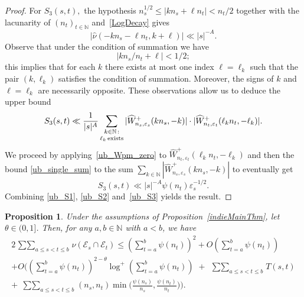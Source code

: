 \documentclass[12pt, reqno]{amsart}
\newtheorem{prop}[thm]{Proposition}
\theoremstyle{definition}
\theoremstyle{remark}
\numberwithin{equation}{section}
\def\tet{{\theta}} \def\bftet{{\boldsymbol \theta}} \def\Tet{{\Theta}}
\def\ls{\leqslant} \def\gs{\geqslant}
\def\leq{\leqslant}
\def \bN {\mathbb N}
\def \cE {\mathcal E}
\begin{document}
\begin{proof}
For $S_3(s,t),$ the hypothesis  $n_s^{1/2}\leq |k n_s+\ell n_t|< n_t/2$ together with the
lacunarity of $(n_t)_{t\in \bN}$
and~\eqref{LogDecay} gives
\[
|\widehat{\nu}\left( -k n_s- \ell n_t, k+\ell \right)| \ll |s|^{-A}.
\]
Observe that under the condition of summation we have
\[
|k n_s/n_t+\ell|< 1/2;
\]
this implies that  for each  $k$ there exists at most one index $\ell=\ell_k$ such that the pair $(k,\ell_k)$ satisfies the condition of summation. Moreover, the signs of $k$ and $\ell=\ell_k$ are necessarily opposite. These observations allow us to deduce the upper bound
\begin{equation*}
S_3(s,t) \ll \frac{1}{|s|^{A}} \mathop{\mathop{\sum}_{ k\in\bN \, : } }_{\ell_k {\rm \, exists}} |\widehat{W}_{n_s,\varepsilon_s}^{+}(k n_s,-k)| 
\cdot
|\widehat{W}_{n_t,\varepsilon_t}^{+}(\ell_k n_t,-\ell_k) |.
\end{equation*}
We proceed by applying~\eqref{ub_Wpm_zero} to $\widehat{W}_{n_t,\varepsilon_t}^{+}(\ell_k n_t,-\ell_k)$
and then the  bound \eqref{ub_single_sum} to the sum  $\sum\limits_{k\in\bN}|\widehat{W}_{n_s,\varepsilon_s}^{+}(k n_s,-k)|$ to eventually get \vspace{-2mm}
\begin{equation}  \label{ub_S3}
S_3(s,t) \ll|s|^{-A}\psi(n_t)\varepsilon_s^{-1/2}.
\end{equation}
Combining \eqref{ub_S1}, \eqref{ub_S2} and~\eqref{ub_S3} yields the result.
\end{proof}

\begin{prop}  \label{indiethm_general} 
Under the assumptions of Proposition~\ref{indieMainThm}, let $\tet \in (0,1]$. Then, for any  $a,b \in \mathbb{N}$ with $a <  b$, we have 
\begin{multline}
\label{ub_sum_eps_psipsi_combined}
2 \mathop{\sum\sum}_{a\leq s<t\leq b} \nu(\cE_{s}\cap \cE_{t})
\ls \left( \sum_{t=a}^{b}\psi(n_t)\right)^2 + O\left( 
\sum_{t=a}^b \psi(n_t)
\right)
\\ +  O\Bigg(\left(\sum_{t=a}^b\psi(n_t) \right)^{2-\theta}\!\!\!\log^+ \left(\sum_{t=a}^b\psi(n_t) \right)\,\, +\,\,  \mathop{\sum\sum}_{a\leq s<t\leq b}T(s,t) 
\\   +  \,\, \mathop{\sum\sum}_{a\leq s<t\leq b}(n_s,n_t)\min\Big(\frac{\psi(n_s)}{n_s},\frac{\psi(n_t)}{n_t}\Big) \Bigg).
\end{multline}
\end{prop}
\end{document}
